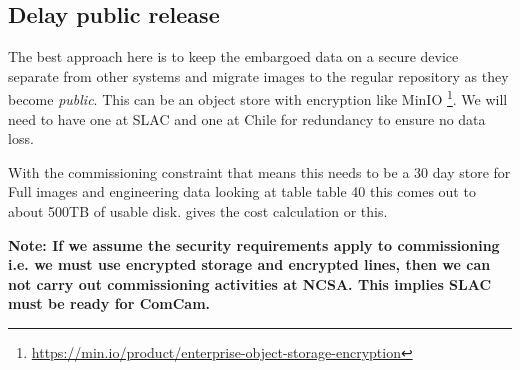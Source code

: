
\subsection{Delay public release} \label{sec:3delay}

The best approach here is to keep the embargoed data on a secure device separate from other systems and migrate images to the regular repository as they become \emph{public}.
This can be an object store with encryption like MinIO \footnote{\url{ https://min.io/product/enterprise-object-storage-encryption}}.
We will need to have one at SLAC and one at Chile for redundancy to ensure no data loss.

With the commissioning constraint that means this needs to be a 30 day store  for Full images and engineering data looking at 
table table 40 this comes out to about 500TB of usable disk.
 gives the cost calculation or this.




\bf{Note:} If we assume the security requirements apply to commissioning i.e. we must use encrypted storage and encrypted lines, then we can not carry out commissioning activities at NCSA. This implies SLAC must be ready for ComCam.
